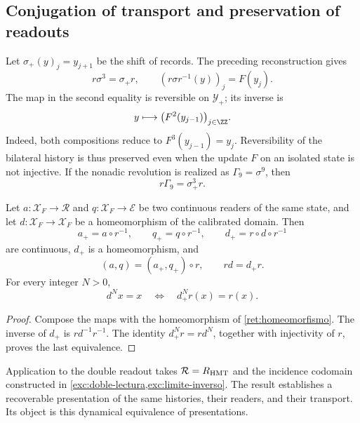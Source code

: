 \subsection{Conjugation of transport and preservation of readouts}

Let \(\sigma_+(y)_j=y_{j+1}\) be the shift of records.
The preceding reconstruction gives
\begin{equation}
 r\sigma^3=\sigma_+r,\qquad
 (r\sigma r^{-1}(y))_j=F(y_j).
 \label{ret:conjugacion}
\end{equation}
The map in the second equality is reversible on
\(\mathscr Y_+\); its inverse is
\[
 y\longmapsto\bigl(F^2(y_{j-1})\bigr)_{j\in\ZZ}.
\]
Indeed, both compositions reduce to
\(F^3(y_{j-1})=y_j\).
Reversibility of the bilateral history is thus preserved even
when the update \(F\) on an isolated state is not injective.
If the nonadic revolution is realized as \(\Gamma_9=\sigma^9\), then
\begin{equation}
 r\Gamma_9=\sigma_+^3r.
 \label{ret:vuelta-nonadica}
\end{equation}

\begin{corollary}
\label{ret:lecturas}
Let \(a:\mathscr X_F\to\mathcal R\) and
\(q:\mathscr X_F\to\mathcal E\) be two continuous readers of the same
state, and let \(d:\mathscr X_F\to\mathscr X_F\) be a homeomorphism of the
calibrated domain. Then
\[
 a_+=a\circ r^{-1},\qquad
 q_+=q\circ r^{-1},\qquad
 d_+=r\circ d\circ r^{-1}
\]
are continuous, \(d_+\) is a homeomorphism, and
\begin{equation}
 (a,q)=(a_+,q_+)\circ r,\qquad rd=d_+r.
 \label{ret:factorizacion}
\end{equation}
For every integer \(N>0\),
\[
 d^Nx=x\quad\Longleftrightarrow\quad d_+^Nr(x)=r(x).
\]
\end{corollary}
\begin{proof}
Compose the maps with the homeomorphism of
\cref{ret:homeomorfismo}. The inverse of \(d_+\) is
\(rd^{-1}r^{-1}\). The identity
\(d_+^Nr=rd^N\), together with injectivity of \(r\), proves the
last equivalence.
\end{proof}

Application to the double readout takes
\(\mathcal R=R_{\rm HMT}\) and the incidence codomain constructed in
\cref{exc:doble-lectura,exc:limite-inverso}.
The result establishes a recoverable presentation of the same
histories, their readers, and their transport. Its object is this
dynamical equivalence of presentations.
